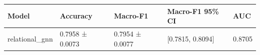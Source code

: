 \begin{tabular}{lllll}
\toprule
Model & Accuracy & Macro-F1 & Macro-F1 95\% CI & AUC \\
\midrule
relational\_gnn & 0.7958 ± 0.0073 & 0.7954 ± 0.0077 & [0.7815, 0.8094] & 0.8705 \\
\bottomrule
\end{tabular}
